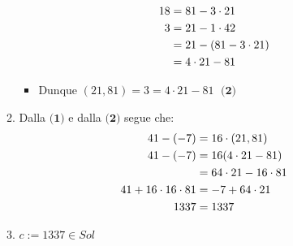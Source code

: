 \documentclass[10pt]{article}
\begin{document}
\begin{itemize}
\begin{enumerate}
\begin{itemize}
\begin{equation}
	\begin{split}
	18 &= 81 - 3 \cdot 21 \\
	3 &= 21 - 1 \cdot 42 \\
	&= 21 - (81 - 3 \cdot 21) \\
	&= 4 \cdot 21 - 81
	\notag
	\end{split}
	\end{equation}
	\item
	Dunque $(21,81) = 3 = 4 \cdot 21 - 81$ $\;\textbf{(2)}$\smallskip \smallskip
	\end{itemize}
	\item
	Dalla $\textbf{(1)}$ e dalla $\textbf{(2)}$ segue che:
	\begin{equation}
	\begin{split}
	41 - (-7) &= 16 \cdot (21,81) \\
	41 - (-7) &= 16 (4\cdot 21 - 81) \\
	&= 64 \cdot 21 - 16 \cdot 81 \\
	41 + 16 \cdot 16 \cdot 81 &= -7 + 64 \cdot 21 \\
	1337 &= 1337
	\notag
	\end{split}
	\end{equation}
	\item
	$c := 1337 \in Sol$


\end{enumerate}
\end{itemize}
\end{document}
